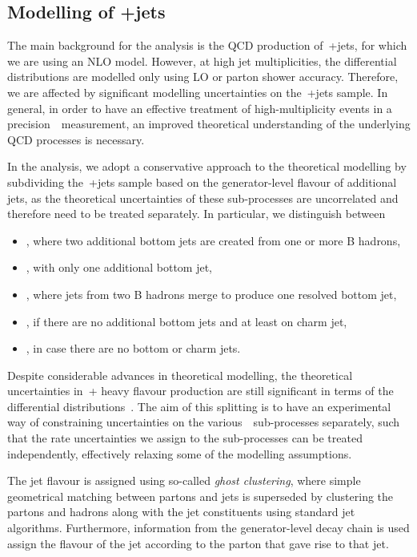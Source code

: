 \subsection{Modelling of \ttbar+jets}
\label{sec:ttbar_subprocesses}
The main background for the analysis is the QCD production of~\ttbar+jets, for which we are using an NLO model. However, at high jet multiplicities, the differential distributions are modelled only using LO or parton shower accuracy. Therefore, we are affected by significant modelling uncertainties on the~\ttbar+jets sample. In general, in order to have an effective treatment of high-multiplicity events in a precision~\ttHbb~measurement, an improved theoretical understanding of the underlying QCD processes is necessary.

In the analysis, we adopt a conservative approach to the theoretical modelling by subdividing the~\ttbar+jets sample based on the generator-level flavour of additional jets, as the theoretical uncertainties of these sub-processes are uncorrelated and therefore need to be treated separately. In particular, we distinguish between
\begin{itemize}
\item \ttbb, where two additional bottom jets are created from one or more B hadrons,
\item \ttb, with only one additional bottom jet,
\item \tttwob, where jets from two B hadrons merge to produce one resolved bottom jet,
\item \ttcc, if there are no additional bottom jets and at least on charm jet,
\item \ttlf, in case there are no bottom or charm jets.
\end{itemize}
Despite considerable advances in theoretical modelling, the theoretical uncertainties in~\ttbar + heavy flavour production are still significant in terms of the differential distributions~\cite{Cascioli:2013era}. The aim of this splitting is to have an experimental way of constraining uncertainties on the various~\ttbar~sub-processes separately, such that the rate uncertainties we assign to the sub-processes can be treated independently, effectively relaxing some of the modelling assumptions. 

The jet flavour is assigned using so-called \textit{ghost clustering}, where simple geometrical matching between partons and jets is superseded by clustering the partons and hadrons along with the jet constituents using standard jet algorithms. Furthermore, information from the generator-level decay chain is used assign the flavour of the jet according to the parton that gave rise to that jet\cite{Bartosik:2047049}.

